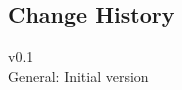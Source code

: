 \documentclass[10pt,a4paper,english]{article}
\begin{document}
\newpage
\begin{multicols}{2} %

\section*{Change History}
v0.1\\
\indent General: Initial version 
\end{multicols}
\end{document}
